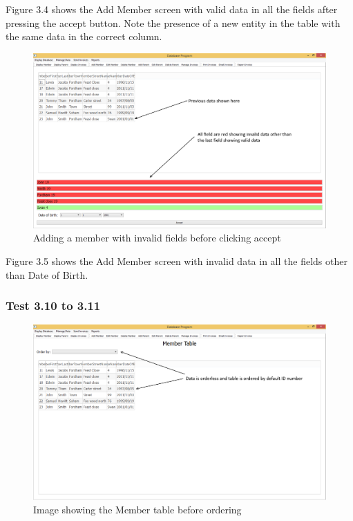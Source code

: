Figure 3.4 shows the Add Member screen with valid data in all the fields after pressing the accept button. Note the presence of a new entity in the table with the same data in the correct column.

\begin{figure}[H]
\includegraphics[width=\textwidth]{./Testing/Images/AddingMember3.png}
    \caption{Adding a member with invalid fields before clicking accept} \label{fig:adding_member_3}
\end{figure}

Figure 3.5 shows the Add Member screen with invalid data in all the fields other than Date of Birth.


\subsubsection{Test 3.10 to 3.11} 
\begin{figure}[H]
\includegraphics[width=\textwidth]{./Testing/Images/DisplayMember1.png}
    \caption{Image showing the Member table before ordering} \label{fig:display_member_1}
\end{figure}

